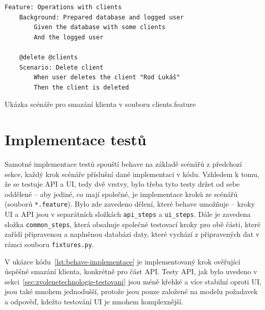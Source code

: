 \begin{listing}[ht]
	\begin{verbatim}
Feature: Operations with clients
    Background: Prepared database and logged user
        Given the database with some clients
        And the logged user
        
    @delete @clients
    Scenario: Delete client
        When user deletes the client "Rod Lukáš"
        Then the client is deleted
	\end{verbatim}
	\caption{Ukázka scénáře pro smazání klienta v souboru clients.feature}\label{lst:gherkin}
\end{listing}

\section{Implementace testů}

Samotné implementace testů spouští behave na základě scénářů z předchozí sekce, každý krok scénáře příslušní dané implementaci v kódu. Vzhledem k tomu, že se testuje API a UI, tedy dvě vrstvy, bylo třeba tyto testy držet od sebe oddělené -- aby jediné, co mají společné, je implementace kroků ze scénářů (souborů \verb|*.feature|). Bylo zde zavedeno dělení, které behave umožňuje -- kroky UI a API jsou v separátních složkách \verb|api_steps| a \verb|ui_steps|. Dále je zavedena složka \verb|common_steps|, která obsahuje společné testovací kroky pro obě části, které zařídí připravenou a naplněnou databázi daty, které vychází z připravených dat v rámci souboru \verb|fixtures.py|.

V ukázce kódu~\ref{lst:behave-implementace} je implementovaný krok ověřující úspěšné smazání klienta, konkrétně pro část API. Testy API, jak bylo uvedeno v sekci~\ref{sec:zvolenetechnologie-testovani} jsou méně křehké a více stabilní oproti UI, jsou také mnohem jednodušší, protože jsou pouze založené na modelu požadavek a odpověď, kdežto testování UI je mnohem komplexnější.


